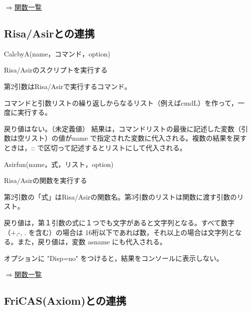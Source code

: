 \documentclass[papersize,a4paper,12pt,uplatex]{jsarticle}
\begin{document}
\begin{flushright}  \hyperlink{functionlist}{$\Rightarrow$関数一覧}\end{flushright}
\newpage


\subsection{Risa/Asirとの連携}

\begin{description}

\hypertarget{calcbyA}{}
\item[関数]  CalcbyA(name，コマンド，option)
\item[機能]  Risa/Asirのスクリプトを実行する
\item[説明]  第2引数はRisa/Asirで実行するコマンド。

  コマンドと引数リストの繰り返しからなるリスト（例えばcmdL）を作って，一度に実行する。
  
  戻り値はない。（未定義値）  結果は，コマンドリストの最後に記述した変数（引数は空リスト）の値がname で指定された変数に代入される。複数の結果を戻すときは，:: で区切って記述するとリストにして代入される。
  

\vspace{\baselineskip}
\hypertarget{asirfun}{}
\item[関数]  Asirfun(name，式，リスト，option)
\item[機能]  Risa/Asirの関数を実行する
\item[説明]  第2引数の「式」はRisa/Asirの関数名。第3引数のリストは関数に渡す引数のリスト。

戻り値は，第１引数の式に１つでも文字があると文字列となる。すべて数字（+,-, . を含む）の場合は
16桁以下であれば数，それ以上の場合は文字列となる。また，戻り値は，変数 asname にも代入される。

オプションに "Disp=no" をつけると，結果をコンソールに表示しない。


\end{description}
\begin{flushright}  \hyperlink{functionlist}{$\Rightarrow$関数一覧}\end{flushright}

\newpage
\subsection{FriCAS(Axiom)との連携}
\end{document}
